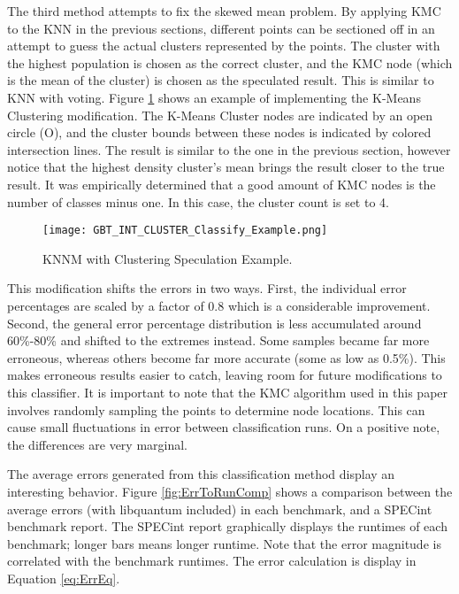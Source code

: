 \documentclass[10pt,twocolumn,letterpaper]{article}
\begin{document}
The third method attempts to fix the skewed mean problem.
By applying KMC to the KNN in the previous sections, different points can be sectioned off in an attempt to guess the actual clusters represented by the points.
The cluster with the highest population is chosen as the correct cluster, and the KMC node (which is the mean of the cluster) is chosen as the speculated result.
This is similar to KNN with voting.
Figure \ref{fig:ClusterClassifyExample} shows an example of implementing the K-Means Clustering modification.
The K-Means Cluster nodes are indicated by an open circle (O), and the cluster bounds between these nodes is indicated by colored intersection lines.
The result is similar to the one in the previous section, however notice that the highest density cluster’s mean brings the result closer to the true result.
It was empirically determined that a good amount of KMC nodes is the number of classes minus one.
In this case, the cluster count is set to 4. 

\begin{figure}[t]
\centering
\texttt{[image: GBT\_INT\_CLUSTER\_Classify\_Example.png]}
\caption{KNNM with Clustering Speculation Example.}
\label{fig:ClusterClassifyExample}
\end{figure}

This modification shifts the errors in two ways.
First, the individual error percentages are scaled by a factor of 0.8 which is a considerable improvement.
Second, the general error percentage distribution is less accumulated around 60\%-80\% and shifted to the extremes instead.
Some samples became far more erroneous, whereas others become far more accurate (some as low as 0.5\%).
This makes erroneous results easier to catch, leaving room for future modifications to this classifier.
It is important to note that the KMC algorithm used in this paper involves randomly sampling the points to determine node locations.
This can cause small fluctuations in error between classification runs.
On a positive note, the differences are very marginal.

The average errors generated from this classification method display an interesting behavior.
Figure \ref{fig:ErrToRunComp} shows a comparison between the average errors (with libquantum included) in each benchmark, and a SPECint benchmark report.
The SPECint report graphically displays the runtimes of each benchmark; longer bars means longer runtime.
Note that the error magnitude is correlated with the benchmark runtimes.
The error calculation is display in Equation \ref{eq:ErrEq}.
\end{document}
